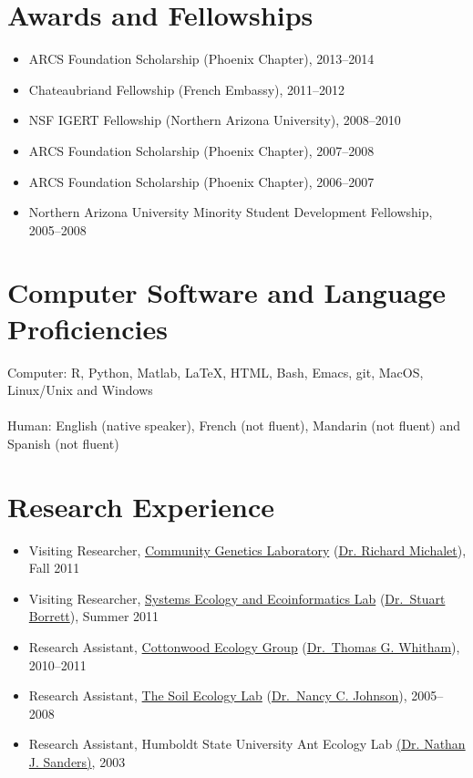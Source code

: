 \documentclass[]{article}
\begin{document}
\section{Awards and Fellowships}\label{awards-and-fellowships}

\begin{itemize}
\item
  ARCS Foundation Scholarship (Phoenix Chapter), 2013--2014
\item
  Chateaubriand Fellowship (French Embassy), 2011--2012
\item
  NSF IGERT Fellowship (Northern Arizona University), 2008--2010
\item
  ARCS Foundation Scholarship (Phoenix Chapter), 2007--2008
\item
  ARCS Foundation Scholarship (Phoenix Chapter), 2006--2007
\item
  Northern Arizona University Minority Student Development Fellowship,
  2005--2008
\end{itemize}

\section{Computer Software and Language
Proficiencies}\label{computer-software-and-language-proficiencies}

Computer: R, Python, Matlab, LaTeX, HTML, Bash, Emacs, git, MacOS,
Linux/Unix and Windows\\\\Human: English (native speaker), French (not
fluent), Mandarin (not fluent) and Spanish (not fluent)

\section{Research Experience}\label{research-experience}

\begin{itemize}
\item
  Visiting Researcher,
  \href{https://www4.bordeaux-aquitaine.inra.fr/biogeco/}{Community
  Genetics Laboratory}
  (\href{http://www4.bordeaux-aquitaine.inra.fr/biogeco_eng/People/Former-members/Michalet-Richard}{Dr.
  Richard Michalet}), Fall 2011
\item
  Visiting Researcher, \href{http://people.uncw.edu/borretts/}{Systems
  Ecology and Ecoinformatics Lab}
  (\href{http://people.uncw.edu/borretts/people.html}{Dr.~Stuart
  Borrett}), Summer 2011
\item
  Research Assistant, \href{http://www.poplar.nau.edu/}{Cottonwood
  Ecology Group}
  (\href{http://www.poplar.nau.edu/people.php?mode=showus\&user=tgw}{Dr.~Thomas
  G. Whitham}), 2010--2011
\item
  Research Assistant,
  \href{http://www.nau.edu/~envsci/johnsonlab/index.htm}{The Soil
  Ecology Lab}
  (\href{http://www.nau.edu/~envsci/johnsonlab/NCJ.htm}{Dr.~Nancy C.
  Johnson}), 2005--2008
\item
  Research Assistant, Humboldt State University Ant Ecology Lab
  \href{http://web.utk.edu/~nsanders/nate.html}{(Dr. Nathan J.
  Sanders)}, 2003
\end{itemize}
\end{document}
